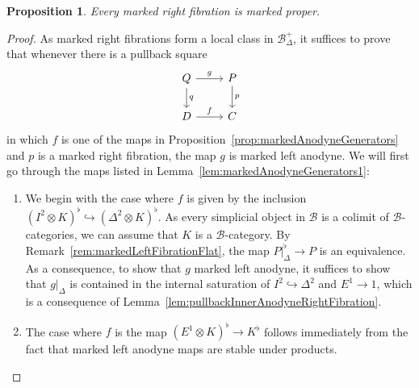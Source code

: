 \documentclass[reqno]{amsart}
\numberwithin{equation}{subsection}
\theoremstyle{plain}
\newtheorem{proposition}[equation]{Proposition}
\theoremstyle{definition}
\let\scr=\mathcal
\let\into=\hookrightarrow
\def\BB{\scr B}
\newcommand{\mSimp}[1]{#1_{\Delta}^+}
\begin{document}
\begin{proposition}
	\label{prop:rightFibrationsProper}
	Every marked right fibration is marked proper.
\end{proposition}
\begin{proof}
	As marked right fibrations form a local class in $\mSimp\BB$, it suffices to prove that whenever there is a pullback square
	\begin{equation*}
	\begin{tikzcd}
	Q\arrow[d, "q"]\arrow[r, "g"] & P\arrow[d, "p"]\\
	D\arrow[r, "f"] & C
	\end{tikzcd}
	\end{equation*}
	in which $f$ is one of the maps in Proposition~\ref{prop:markedAnodyneGenerators} and $p$ is a marked right fibration, the map $g$ is marked left anodyne. We will first go through the maps listed in Lemma~\ref{lem:markedAnodyneGenerators1}:
	\begin{enumerate}
	\item We begin with the case where $f$ is given by the inclusion $(I^2\otimes K)^\flat\into(\Delta^2\otimes K)^\flat$. As every simplicial object in $\BB$ is a colimit of $\BB$-categories, we can assume that $K$ is a $\BB$-category. By Remark~\ref{rem:markedLeftFibrationFlat}, the map $P\vert_{\Delta}^\flat\to P$ is an equivalence. As a consequence, to show that $g$ marked left anodyne, it suffices to show that $g\vert_\Delta$ is contained in the internal saturation of $I^2\into\Delta^2$ and $E^1\to 1$, which is a consequence of Lemma~\ref{lem:pullbackInnerAnodyneRightFibration}.

	\item The case where $f$ is the map $(E^1\otimes K)^\flat\to K^\flat$ follows immediately from the fact that marked left anodyne maps are stable under products.
	

\end{enumerate}
\end{proof}
\end{document}
